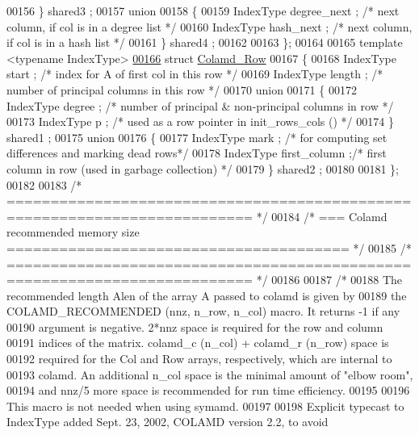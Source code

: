 \begin{DoxyCode}
00156   \} shared3 ;
00157   \textcolor{keyword}{union}
00158   \{
00159     IndexType degree\_next ; \textcolor{comment}{/* next column, if col is in a degree list */}
00160     IndexType hash\_next ;   \textcolor{comment}{/* next column, if col is in a hash list */}
00161   \} shared4 ;
00162   
00163 \};
00164  
00165 \textcolor{keyword}{template} <\textcolor{keyword}{typename} IndexType>
\hyperlink{structinternal_1_1_colamd___row}{00166} \textcolor{keyword}{struct }\hyperlink{structinternal_1_1_colamd___row}{Colamd\_Row}
00167 \{
00168   IndexType start ;   \textcolor{comment}{/* index for A of first col in this row */}
00169   IndexType length ;  \textcolor{comment}{/* number of principal columns in this row */}
00170   \textcolor{keyword}{union}
00171   \{
00172     IndexType degree ;  \textcolor{comment}{/* number of principal & non-principal columns in row */}
00173     IndexType p ;   \textcolor{comment}{/* used as a row pointer in init\_rows\_cols () */}
00174   \} shared1 ;
00175   \textcolor{keyword}{union}
00176   \{
00177     IndexType mark ;  \textcolor{comment}{/* for computing set differences and marking dead rows*/}
00178     IndexType first\_column ;\textcolor{comment}{/* first column in row (used in garbage collection) */}
00179   \} shared2 ;
00180   
00181 \};
00182  
00183 \textcolor{comment}{/* ========================================================================== */}
00184 \textcolor{comment}{/* === Colamd recommended memory size ======================================= */}
00185 \textcolor{comment}{/* ========================================================================== */}
00186  
00187 \textcolor{comment}{/*}
00188 \textcolor{comment}{  The recommended length Alen of the array A passed to colamd is given by}
00189 \textcolor{comment}{  the COLAMD\_RECOMMENDED (nnz, n\_row, n\_col) macro.  It returns -1 if any}
00190 \textcolor{comment}{  argument is negative.  2*nnz space is required for the row and column}
00191 \textcolor{comment}{  indices of the matrix. colamd\_c (n\_col) + colamd\_r (n\_row) space is}
00192 \textcolor{comment}{  required for the Col and Row arrays, respectively, which are internal to}
00193 \textcolor{comment}{  colamd.  An additional n\_col space is the minimal amount of "elbow room",}
00194 \textcolor{comment}{  and nnz/5 more space is recommended for run time efficiency.}
00195 \textcolor{comment}{  }
00196 \textcolor{comment}{  This macro is not needed when using symamd.}
00197 \textcolor{comment}{  }
00198 \textcolor{comment}{  Explicit typecast to IndexType added Sept. 23, 2002, COLAMD version 2.2, to avoid}

\end{DoxyCode}
